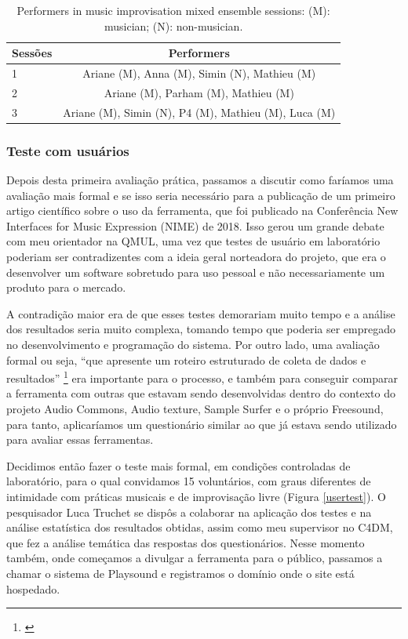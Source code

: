 \begin{table}

\caption{Performers in music improvisation mixed ensemble sessions: (M): musician; (N): non-musician.}
\begin{tabular}{|lc|} \hline
Sessões & Performers \\ \hline
1 & Ariane (M), Anna (M), Simin (N), Mathieu (M)\\ \hline
2 & Ariane (M), Parham (M), Mathieu (M) \\ \hline
3 & Ariane (M), Simin (N), P4 (M), Mathieu (M), Luca (M)\\
\hline\end{tabular}
\label{tab:puppets}
\end{table}

\subsubsection{Teste com usuários}

Depois desta primeira avaliação prática, passamos a discutir como faríamos uma avaliação mais formal e se isso seria necessário para a publicação de um primeiro artigo científico sobre o uso da ferramenta, que foi publicado na Conferência New Interfaces for Music Expression (NIME) de 2018. Isso gerou um grande debate com meu orientador na QMUL, uma vez que testes de usuário em laboratório poderiam ser contradizentes com a ideia geral norteadora do projeto, que era o desenvolver um software sobretudo para uso pessoal e não necessariamente um produto para o mercado. 


A contradição maior era de que esses testes demorariam muito tempo e a análise dos resultados seria muito complexa, tomando tempo que poderia ser empregado no desenvolvimento e programação do sistema. Por outro lado, uma avaliação formal ou seja, ``que apresente um roteiro estruturado de coleta de dados e resultados'' \footnote{\cite{Stowell}} era importante para o processo, e também para conseguir comparar a ferramenta com outras que estavam sendo desenvolvidas dentro do contexto do projeto Audio Commons, Audio texture, Sample Surfer e o próprio Freesound, para tanto, aplicaríamos um questionário similar ao que já estava sendo utilizado para avaliar essas ferramentas.


Decidimos então fazer o teste mais formal, em condições controladas de laboratório, para o qual convidamos 15 voluntários, com graus diferentes de intimidade com práticas musicais e de improvisação livre (Figura \ref{usertest}). O pesquisador Luca Truchet se dispôs a colaborar na aplicação dos testes e na análise estatística dos resultados obtidas, assim como meu supervisor no C4DM, que fez a análise temática das respostas dos questionários. Nesse momento também, onde começamos a divulgar a ferramenta para o público, passamos a chamar o sistema de Playsound e registramos o domínio onde o site está hospedado.


